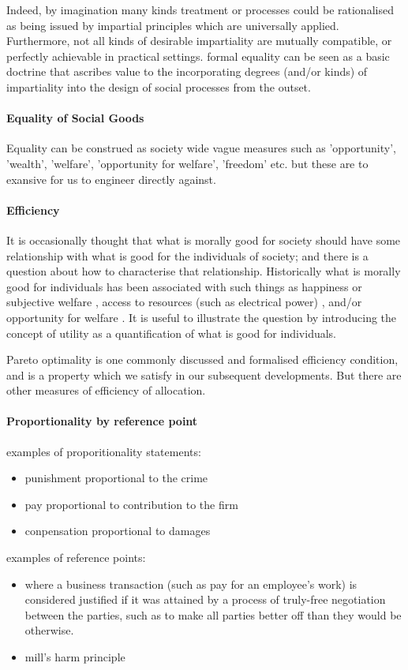 \documentclass[
10pt, %
a4paper, %
oneside, %
headinclude,footinclude, %
BCOR5mm, %
]{scrartcl}
\begin{document}
Indeed, by imagination many kinds treatment or processes could be rationalised as being issued by impartial principles which are universally applied. Furthermore, not all kinds of desirable impartiality are mutually compatible, or perfectly achievable in practical settings.
formal equality can be seen as a basic doctrine that ascribes value to the incorporating degrees (and/or kinds) of impartiality into the design of social processes from the outset.

\paragraph{Equality of Social Goods}

Equality can be construed as society wide vague measures such as 'opportunity', 'wealth', 'welfare', 'opportunity for welfare', 'freedom' etc.
but these are to exansive for us to engineer directly against.

\paragraph{Efficiency}

It is occasionally thought that what is morally good for society should have some relationship with what is good for the individuals of society; and there is a question about how to characterise that relationship.
Historically what is morally good for individuals has been associated with such things as happiness \cite{burns2005happiness} or subjective welfare \cite{10.2307/2264894}, access to resources (such as electrical power) \cite{10.2307/2265047}, and/or opportunity for welfare \cite{10.2307/4320203}.
It is useful to illustrate the question by introducing the concept of utility as a quantification of what is good for individuals.

Pareto optimality is one commonly discussed and formalised efficiency condition, and is a property which we satisfy in our subsequent developments.
But there are other measures of efficiency of allocation.

\paragraph{Proportionality by reference point}

examples of proporitionality statements:
\begin{itemize}
\item	punishment proportional to the crime
\item	pay proportional to contribution to the firm
\item	conpensation proportional to damages
\end{itemize}
examples of reference points:
\begin{itemize}
\item	where a business transaction (such as pay for an employee's work) is considered justified if it was attained by a process of truly-free negotiation between the parties, such as to make all parties better off than they would be otherwise.
\item	mill's harm principle
\end{itemize}
\end{document}
